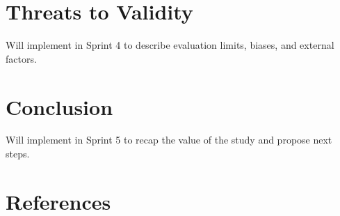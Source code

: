 \documentclass[12pt]{article}
\begin{document}
\section{Threats to Validity}
 Will implement in Sprint 4 to describe evaluation limits, biases, and external factors.

\section{Conclusion}
Will implement in Sprint 5 to recap the value of the study and propose next steps.

\section*{References}
\end{document}
